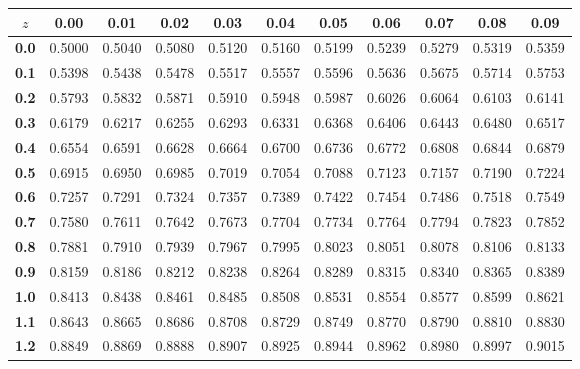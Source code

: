 \begin{center}
\small
\begin{tabular}{c|c|c|c|c|c|c|c|c|c|c}
\hline
\multicolumn{1}{c}{$z$}   & \multicolumn{1}{c}{\textbf{0.00}}    & \multicolumn{1}{c}{\textbf{0.01}}    & \multicolumn{1}{c}{\textbf{0.02}}    & \multicolumn{1}{c}{\textbf{0.03}}    & \multicolumn{1}{c}{\textbf{0.04}}    & \multicolumn{1}{c}{\textbf{0.05}}    & \multicolumn{1}{c}{\textbf{0.06}}    & \multicolumn{1}{c}{\textbf{0.07}}    & \multicolumn{1}{c}{\textbf{0.08}}    & \multicolumn{1}{c}{\textbf{0.09}}    \bstrut\tstrut\\
\hline
\textbf{0.0} & 0.5000  & 0.5040  & 0.5080  & 0.5120  & 0.5160  & 0.5199  & 0.5239  & 0.5279  & 0.5319  & 0.5359  \tstrut\\
\textbf{0.1} & 0.5398  & 0.5438  & 0.5478  & 0.5517  & 0.5557  & 0.5596  & 0.5636  & 0.5675  & 0.5714  & 0.5753  \\
\textbf{0.2} & 0.5793  & 0.5832  & 0.5871  & 0.5910  & 0.5948  & 0.5987  & 0.6026  & 0.6064  & 0.6103  & 0.6141  \\
\textbf{0.3} & 0.6179  & 0.6217  & 0.6255  & 0.6293  & 0.6331  & 0.6368  & 0.6406  & 0.6443  & 0.6480  & 0.6517  \\
\textbf{0.4} & 0.6554  & 0.6591  & 0.6628  & 0.6664  & 0.6700  & 0.6736  & 0.6772  & 0.6808  & 0.6844  & 0.6879  \\
\textbf{0.5} & 0.6915  & 0.6950  & 0.6985  & 0.7019  & 0.7054  & 0.7088  & 0.7123  & 0.7157  & 0.7190  & 0.7224  \\
\textbf{0.6} & 0.7257  & 0.7291  & 0.7324  & 0.7357  & 0.7389  & 0.7422  & 0.7454  & 0.7486  & 0.7518  & 0.7549  \\
\textbf{0.7} & 0.7580  & 0.7611  & 0.7642  & 0.7673  & 0.7704  & 0.7734  & 0.7764  & 0.7794  & 0.7823  & 0.7852  \\
\textbf{0.8} & 0.7881  & 0.7910  & 0.7939  & 0.7967  & 0.7995  & 0.8023  & 0.8051  & 0.8078  & 0.8106  & 0.8133  \\
\textbf{0.9} & 0.8159  & 0.8186  & 0.8212  & 0.8238  & 0.8264  & 0.8289  & 0.8315  & 0.8340  & 0.8365  & 0.8389  \\
\textbf{1.0} & 0.8413  & 0.8438  & 0.8461  & 0.8485  & 0.8508  & 0.8531  & 0.8554  & 0.8577  & 0.8599  & 0.8621  \\
\textbf{1.1} & 0.8643  & 0.8665  & 0.8686  & 0.8708  & 0.8729  & 0.8749  & 0.8770  & 0.8790  & 0.8810  & 0.8830  \\
\textbf{1.2} & 0.8849  & 0.8869  & 0.8888  & 0.8907  & 0.8925  & 0.8944  & 0.8962  & 0.8980  & 0.8997  & 0.9015  \\

\end{tabular}
\end{center}
